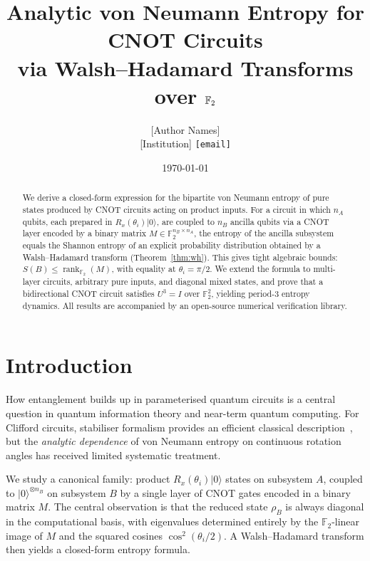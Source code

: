 \documentclass[11pt,a4paper]{article}
\title{Analytic von Neumann Entropy for CNOT Circuits\\
via Walsh–Hadamard Transforms over $\F_2$}
\author{[Author Names]\\
\small [Institution] \quad \texttt{[email]}}
\date{\today}
\newcommand{\F}{\mathbb{F}}
\newcommand{\rk}{\operatorname{rank}_{\F_2}}
\newcommand{\VNE}{S}
\begin{document}
\maketitle

\begin{abstract}
We derive a closed-form expression for the bipartite von Neumann entropy of
pure states produced by CNOT circuits acting on product inputs.
For a circuit in which $n_A$ qubits, each prepared in $R_x(\theta_i)|0\rangle$,
are coupled to $n_B$ ancilla qubits via a CNOT layer encoded by a binary
matrix $M \in \F_2^{n_B \times n_A}$, the entropy of the ancilla subsystem
equals the Shannon entropy of an explicit probability distribution
obtained by a Walsh–Hadamard transform (Theorem~\ref{thm:wh}).
This gives tight algebraic bounds: $\VNE(B) \leq \rk(M)$, with equality at
$\theta_i = \pi/2$. We extend the formula to multi-layer circuits, arbitrary
pure inputs, and diagonal mixed states, and prove that a bidirectional CNOT
circuit satisfies $U^3 = I$ over $\F_2^2$, yielding period-3 entropy dynamics.
All results are accompanied by an open-source numerical verification library.
\end{abstract}

\tableofcontents
\bigskip

\section{Introduction}
\label{sec:intro}

How entanglement builds up in parameterised quantum circuits is a central
question in quantum information theory and near-term quantum computing.
For Clifford circuits, stabiliser formalism provides an efficient classical
description~\cite{gottesman1997stabilizer,aaronson2004improved}, but the
\emph{analytic dependence} of von Neumann entropy on continuous rotation
angles has received limited systematic treatment.

We study a canonical family: product $R_x(\theta_i)|0\rangle$ states on
subsystem $A$, coupled to $|0\rangle^{\otimes n_B}$ on subsystem $B$ by a
single layer of CNOT gates encoded in a binary matrix $M$.  The central
observation is that the reduced state $\rho_B$ is always diagonal in the
computational basis, with eigenvalues determined entirely by the $\F_2$-linear
image of $M$ and the squared cosines $\cos^2(\theta_i/2)$.  A
Walsh–Hadamard transform then yields a closed-form entropy formula.
\end{document}
